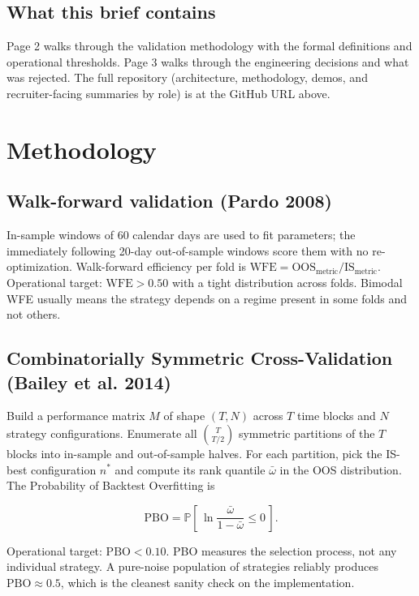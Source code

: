 \documentclass[10pt,letterpaper]{article}
\begin{document}
\subsection{What this brief contains}

Page 2 walks through the validation methodology with the formal definitions and operational thresholds. Page 3 walks through the engineering decisions and what was rejected. The full repository (architecture, methodology, demos, and recruiter-facing summaries by role) is at the GitHub URL above.

\newpage

\section{Methodology}

\subsection{Walk-forward validation (Pardo 2008)}

In-sample windows of 60 calendar days are used to fit parameters; the immediately following 20-day out-of-sample windows score them with no re-optimization. Walk-forward efficiency per fold is $\text{WFE} = \text{OOS}_\text{metric} / \text{IS}_\text{metric}$. Operational target: $\text{WFE} > 0.50$ with a tight distribution across folds. Bimodal WFE usually means the strategy depends on a regime present in some folds and not others.

\subsection{Combinatorially Symmetric Cross-Validation (Bailey et al. 2014)}

Build a performance matrix $M$ of shape $(T, N)$ across $T$ time blocks and $N$ strategy configurations. Enumerate all $\binom{T}{T/2}$ symmetric partitions of the $T$ blocks into in-sample and out-of-sample halves. For each partition, pick the IS-best configuration $n^\ast$ and compute its rank quantile $\bar\omega$ in the OOS distribution. The Probability of Backtest Overfitting is

\[
\text{PBO} = \mathbb{P}\left[\,\ln \frac{\bar\omega}{1 - \bar\omega} \le 0\,\right].
\]

Operational target: $\text{PBO} < 0.10$. PBO measures the selection process, not any individual strategy. A pure-noise population of strategies reliably produces $\text{PBO} \approx 0.5$, which is the cleanest sanity check on the implementation.
\end{document}
